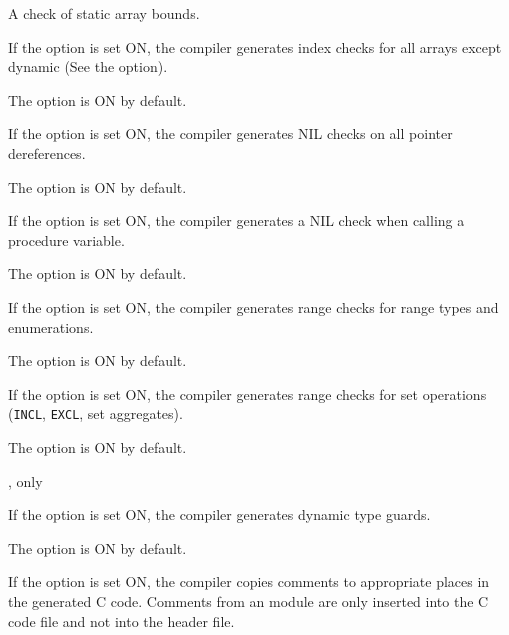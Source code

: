 \begin{description}
        \MLBegin{}\ModeC{}\MLEnd{} \inline

        A check of static array bounds.

        If the option is set ON, the compiler generates index checks
        for all arrays except dynamic (See the  option).

        The option is ON by default.

        \MLBegin{}\ModeC{}\MLEnd{} \inline

        If the option is set ON, the compiler generates NIL checks
        on all pointer dereferences.

        The option is ON by default.

        \MLBegin{}\ModeC{}\MLEnd{} \inline

        If the option is set ON, the compiler generates a NIL check
        when calling a procedure variable.

        The option is ON by default.

        \MLBegin{}\ModeC{}\MLEnd{} \inline

        If the option is set ON, the compiler generates range checks
        for range types and enumerations.

        The option is ON by default.

        \MLBegin{}\ModeC{}\MLEnd{} \inline

        If the option is set ON, the compiler generates range checks
        for set operations (\verb'INCL', \verb'EXCL', set aggregates).

        The option is ON by default.


        \MLBegin{}\ModeC{}, \ot{} only\MLEnd{} \inline

        If the option is set ON, the compiler generates dynamic type guards.

        The option is ON by default.

\ifgenc
{}
        \MLBegin{}\ModeC{}\MLEnd{} \header

        If the option is set ON,  the  compiler copies comments
        to appropriate places in the generated C code.
        Comments  from  an \ot{} module are only inserted  into
        the  C code file and not into the header file.
\fi


\end{description}
